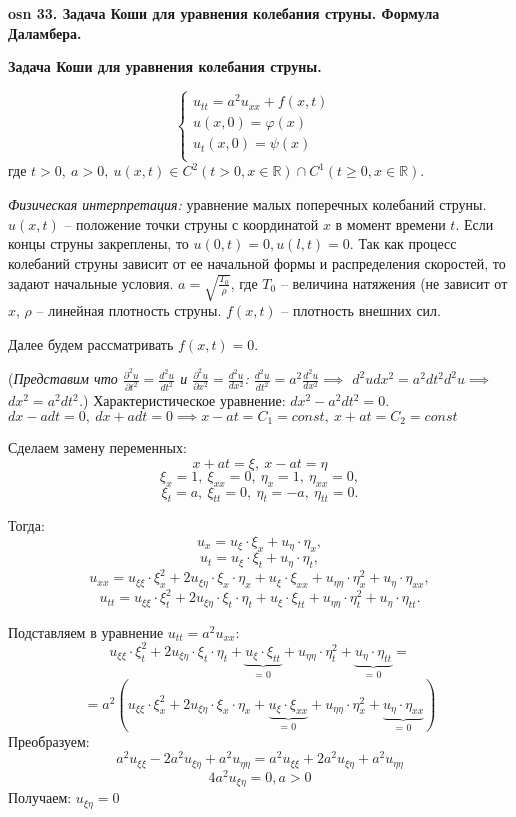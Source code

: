 \setcounter{section}{15}
\setcounter{subsection}{33}
\setcounter{equation}{0}
\textbf{\LARGE osn 33. Задача Коши для уравнения колебания струны. Формула Даламбера.}

\textbf{Задача Коши для уравнения колебания струны.}

$$\begin{cases}
u_{tt}=a^2u_{xx}+f(x,t)&\\
u(x,0)=\varphi(x)&\\
u_t(x,0)=\psi(x)&\\
\end{cases}$$ где $t>0,~a>0,~u(x,t)\in C^2(t > 0, x\in \mathbb{R})\cap C^1(t \geqslant 0, x\in \mathbb{R})$.

\bigbreak
\textit{Физическая интерпретация:} уравнение малых поперечных колебаний струны. $u(x,t)$ -- положение точки струны с координатой $x$ в момент времени $t$. Если концы струны закреплены, то $u(0,t)=0, u(l,t)=0$. Так как процесс колебаний струны зависит от ее начальной формы и распределения скоростей, то задают начальные условия. $a = \sqrt{\frac{T_0}{\rho}}$, где $T_0$ -- величина натяжения (не зависит от $x$, $\rho$ -- линейная плотность струны. $f(x,t)$ -- плотность внешних сил.

\bigbreak
Далее будем рассматривать $f(x,t) = 0$.
\bigbreak

(\textit{Представим что $\frac{\partial^2u}{\partial t^2} = \frac{d^2u}{dt^2}$ и $\frac{\partial^2u}{\partial x^2} = \frac{d^2u}{dx^2}$:
$\frac{d^2u}{dt^2} = a^2\frac{d^2u}{dx^2} \implies$
${d^2udx^2 = a^2dt^2d^2u} \implies$
${dx^2 = a^2dt^2}$.})
Характеристическое уравнение: $dx^2-a^2dt^2=0$. \\
$dx - adt=0, ~ dx+adt = 0 \implies x-at=C_1 = const, ~ x+at=C_2 = const$

Сделаем замену переменных: $$x+at=\xi,~x-at=\eta$$
$$\xi_x=1, ~ \xi_{xx}=0, ~ \eta_x = 1,  ~ \eta_{xx} = 0,$$
$$\xi_t=a, ~ \xi_{tt}=0, ~ \eta_t = -a, ~ \eta_{tt} = 0.$$

Тогда:
$$u_x=u_{\xi}\cdot\xi_x+u_{\eta}\cdot\eta_x,$$
$$u_t=u_{\xi}\cdot\xi_t+u_{\eta}\cdot\eta_t,$$
$$u_{xx}=u_{\xi\xi}\cdot\xi_x^2+2u_{\xi\eta}\cdot\xi_x\cdot\eta_x+u_{\xi}\cdot\xi_{xx}+u_{\eta\eta}\cdot\eta_x^2+u_{\eta}\cdot\eta_{xx},$$
$$u_{tt}=u_{\xi\xi}\cdot\xi_t^2+2u_{\xi\eta}\cdot\xi_t\cdot\eta_t+u_{\xi}\cdot\xi_{tt}+u_{\eta\eta}\cdot\eta_t^2+u_{\eta}\cdot\eta_{tt}.$$

Подставляем в уравнение $u_{tt}=a^2u_{xx}$:
$$u_{\xi\xi}\cdot\xi_t^2+2u_{\xi\eta}\cdot\xi_t\cdot\eta_t+\displaystyle\underbrace{u_{\xi}\cdot\xi_{tt}}_{\text{= 0}}+u_{\eta\eta}\cdot\eta_t^2+\displaystyle\underbrace{u_{\eta}\cdot\eta_{tt}}_{\text{= 0}}=$$ $$=a^2(u_{\xi\xi}\cdot\xi_x^2+2u_{\xi\eta}\cdot\xi_x\cdot\eta_x+\displaystyle\underbrace{u_{\xi}\cdot\xi_{xx}}_{\text{= 0}}+u_{\eta\eta}\cdot\eta_x^2+\displaystyle\underbrace{u_{\eta}\cdot\eta_{xx}}_{\text{= 0}})$$
Преобразуем:
$$a^2u_{\xi\xi}-2a^2u_{\xi\eta}+a^2u_{\eta\eta}=a^2u_{\xi\xi}+2a^2u_{\xi\eta}+a^2u_{\eta\eta}$$
$$4a^2u_{\xi\eta}=0,   a>0$$
Получаем: $u_{\xi\eta}=0$

